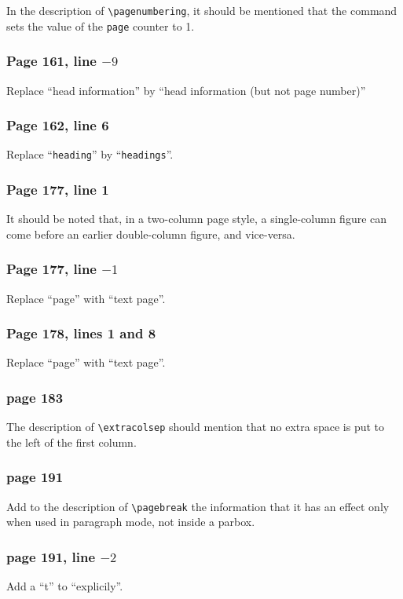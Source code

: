 In the description of \verb|\pagenumbering|, it should be mentioned
that the command sets the value of the {\tt page} counter to 1.

\subsubsection*{Page 161, line $-9$}
Replace ``head information'' by ``head information (but not
page number)''

\subsubsection*{Page 162, line 6}
Replace ``{\tt heading}'' by ``{\tt headings}''.

\subsubsection*{Page 177, line 1}
It should be noted that, in a two-column page style, a single-column
figure can come before an earlier double-column figure, and vice-versa.

\subsubsection*{Page 177, line $-1$}
Replace ``page'' with ``text page''.

\subsubsection*{Page 178, lines 1 and 8}
Replace ``page'' with ``text page''.  

\subsubsection*{page 183}
The description of \verb|\extracolsep| should mention that no extra
space is put to the left of the first column.

\subsubsection*{page 191}
Add to the description of \verb|\pagebreak| the
information that it has an effect only when used in paragraph mode,
not inside a parbox.

\subsubsection*{page 191, line $-2$}
Add a ``t'' to ``explicily''.

